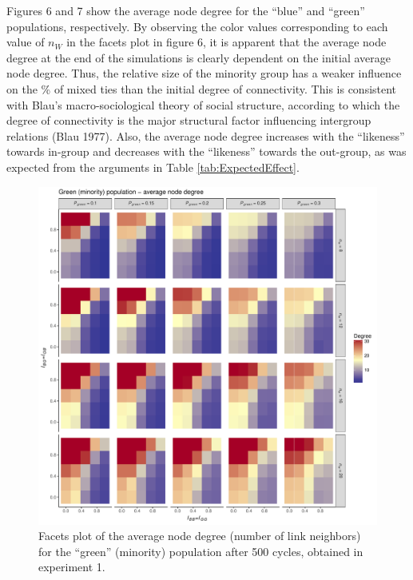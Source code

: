 Figures 6 and 7 show the average node degree for the ``blue'' and ``green'' populations, respectively. By observing the color values corresponding to each value of $ n_{W} $ in the facets plot in figure 6, it is apparent that the average node degree at the end of the simulations is clearly dependent on the initial average node degree. Thus, the relative size of the minority group has a weaker influence on the \% of mixed ties than the initial degree of connectivity. This is consistent with Blau's macro-sociological theory of social structure, according to which the degree of connectivity is the major structural factor influencing intergroup relations (Blau 1977). Also, the average node degree increases with the ``likeness'' towards in-group and decreases with the ``likeness'' towards the out-group, as was expected from the arguments in Table \ref{tab:ExpectedEffect}.
\begin{figure}[ht!]
	\label{fig:avgGreenAgentDegreeExperiment1}
	\begin{minipage}[c]{0.2\linewidth}
		\caption{Facets plot of the average node degree (number of link neighbors) for the ``green'' (minority) population after 500 cycles, obtained in experiment 1.}
	\end{minipage}
	\begin{minipage}[c]{0.75\linewidth}
		\includegraphics[trim={0cm 0cm 0.4cm 0cm}, clip, width=\linewidth]{figures/avgGreenAgentDegreeExperiment1.pdf}
	\end{minipage}
\end{figure}

